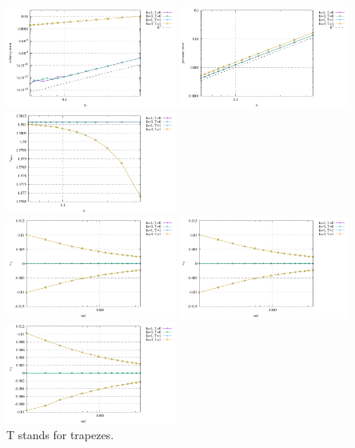 \begin{center}
\includegraphics[width=5.6cm]{python_codes/fieldstone_151/results/test4/errv}
\includegraphics[width=5.6cm]{python_codes/fieldstone_151/results/test4/errp}
\includegraphics[width=5.6cm]{python_codes/fieldstone_151/results/test4/vrms}\\
\includegraphics[width=5.6cm]{python_codes/fieldstone_151/results/test4/e_rr}
\includegraphics[width=5.6cm]{python_codes/fieldstone_151/results/test4/e_tt}
\includegraphics[width=5.6cm]{python_codes/fieldstone_151/results/test4/e_rt}\\
{\captionfont T stands for {\python trapezes}.}
\end{center}

